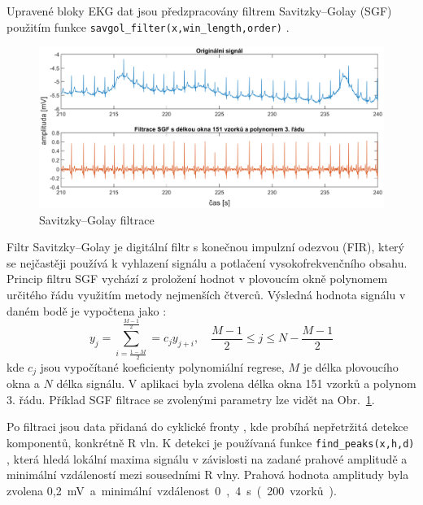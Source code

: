 Upravené bloky EKG dat jsou předzpracovány filtrem Savitzky–Golay (SGF)
\cite{Schafer2011} použitím funkce
\texttt{savgol{\_}filter(x,win{\_}length,order)} \cite{scipySavgol}.
\begin{figure}[h]
    \begin{center}
        \includegraphics[width=1\textwidth]{../assets/figures/sgf_filter}
        \caption{Savitzky–Golay filtrace}
        \label{fig:sgf_filter}
    \end{center}
\end{figure}
Filtr Savitzky–Golay je digitální filtr s konečnou impulzní odezvou (FIR), který
se nejčastěji používá k vyhlazení signálu a potlačení vysokofrekvenčního obsahu.
Princip filtru SGF vychází z proložení hodnot v plovoucím okně polynomem
určitého řádu využitím metody nejmenších čtverců. Výsledná hodnota signálu v
daném bodě je vypočtena jako \cite{wikiSGF}:
\begin{equation}
    y_j = \sum_{i=\frac{1-M}{2}}^{\frac{M-1}{2}} = c_j y_{j+i}, \quad \frac{M-1}{2} \leq j \leq N - \frac{M-1}{2}
\end{equation}
kde $c_j$ jsou vypočítané koeficienty polynomiální regrese, $M$ je délka
plovoucího okna a $N$ délka signálu. V aplikaci byla zvolena délka okna 151
vzorků a polynom 3. řádu. Příklad SGF filtrace se zvolenými parametry lze vidět
na Obr.~\ref{fig:sgf_filter}.

Po filtraci jsou data přidaná do cyklické fronty \cite{circlebuffer}, kde
probíhá nepřetržitá detekce komponentů, konkrétně R vln. K detekci je používaná
funkce \texttt{find{\_}peaks(x,h,d)} \cite{scipyFindpeaks}, která hledá lokální
maxima signálu v závislosti na zadané prahové amplitudě a minimální vzdáleností
mezi sousedními R vlny. Prahová hodnota amplitudy byla zvolena 0,2~\si\mV~a
minimální vzdálenost 0,4~\si\s~ (200 vzorků).

